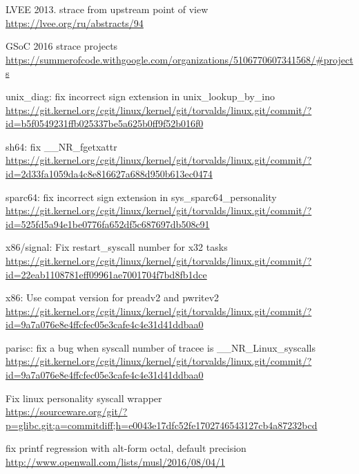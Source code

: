 \documentclass[10pt, a5paper]{article}
\begin{document}
\begin{thebibliography}{99}

 LVEE 2013. strace from upstream point of view \\
\url{https://lvee.org/ru/abstracts/94}

 GSoC 2016 strace projects \\
\url{https://summerofcode.withgoogle.com/organizations/5106770607341568/#projects}

 unix\_diag: fix incorrect sign extension in
unix\_lookup\_by\_ino \\
\url{https://git.kernel.org/cgit/linux/kernel/git/torvalds/linux.git/commit/?id=b5f0549231ffb025337be5a625b0ff9f52b016f0}

 sh64: fix \_\_NR\_fgetxattr \\
\url{https://git.kernel.org/cgit/linux/kernel/git/torvalds/linux.git/commit/?id=2d33fa1059da4c8e816627a688d950b613ec0474}

 sparc64: fix incorrect sign extension in
sys\_sparc64\_personality \\
\url{https://git.kernel.org/cgit/linux/kernel/git/torvalds/linux.git/commit/?id=525fd5a94e1be0776fa652df5c687697db508c91}

 x86/signal: Fix restart\_syscall number for x32 tasks \\
\url{https://git.kernel.org/cgit/linux/kernel/git/torvalds/linux.git/commit/?id=22eab1108781eff09961ae7001704f7bd8fb1dce}

 x86: Use compat version for preadv2 and pwritev2 \\
\url{https://git.kernel.org/cgit/linux/kernel/git/torvalds/linux.git/commit/?id=9a7a076e8e4ffcfec05e3cafe4c4e31d41ddbaa0}

 parisc: fix a bug when syscall number of tracee is \_\_NR\_Linux\_syscalls \\
\url{https://git.kernel.org/cgit/linux/kernel/git/torvalds/linux.git/commit/?id=9a7a076e8e4ffcfec05e3cafe4c4e31d41ddbaa0}

 Fix linux personality syscall wrapper \\
\url{https://sourceware.org/git/?p=glibc.git;a=commitdiff;h=e0043e17dfc52fe1702746543127cb4a87232bcd}

 fix printf regression with alt-form octal, default precision \\
\url{http://www.openwall.com/lists/musl/2016/08/04/1}

\end{thebibliography}
\end{document}
